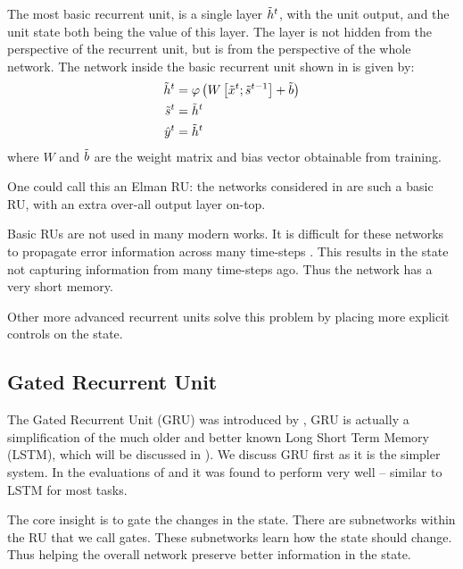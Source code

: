 \documentclass[12pt,parskip]{komatufte}
\begin{document}
The most basic recurrent unit, is a single layer $\nv h_t$, with the unit output, and the unit state both being the value of this layer.
The layer is not hidden from the perspective of the recurrent unit, but is from the perspective of the whole network.
The network inside the basic recurrent unit shown in  is given by:
\begin{align}
\nv h_t &= \varphi\left(W \left[\nv x_t; \nv s_{t-1}\right]+ \v b \right)\\
\nv s_t & = \nv h_t \\
\n \hat{y}_t &= \nv h_t
\end{align}
where $W$ and $\tilde{b}$ are the weight matrix and bias vector obtainable from training.

One could call this an Elman RU:
the networks considered in  are such a basic RU, with an extra over-all output layer on-top.

Basic RUs are not used in many modern works.
It is difficult for these networks to propagate error information across many time-steps .
This results in the state not capturing information from many time-steps ago.
Thus the network has a very short memory.

Other more advanced recurrent units solve this problem by placing more explicit controls on the state.

\subsection{Gated Recurrent Unit}
The Gated Recurrent Unit (GRU) was introduced by ,
GRU is actually a simplification of the much older and better known Long Short Term Memory (LSTM),
which will be discussed in ).
We discuss GRU first as it is the simpler system.
In the evaluations of  and  it was found to perform very well -- similar to LSTM for most tasks.

The core insight is to gate the changes in the state.
There are subnetworks within the RU that we call gates.
These subnetworks learn how the state should change.
Thus helping the overall network preserve better information in the state.
\end{document}
